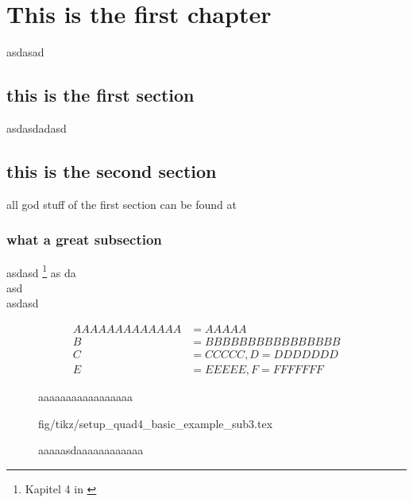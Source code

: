 

\chapter{This is the first chapter} \label{cha:Optimierung}
asdasad
\section{this is the first section}
\label{sec:firstsections}
asdasdadasd
\section{this is the second section}
\label{sec:secondsections}
all god stuff of the first section can be found at 
\subsection{what a great subsection}
asdasd \footnote{Kapitel 4 in \cite{Farhat1991}}
as
da\\
asd
\cite{Optimierung2012}\\
asdasd \cite{Farhat1998}


\begin{equation} \label{eq:test}
    \begin{aligned} 
        AAAAAAAAAAAAA &= AAAAA\\
        B &= BBBBBBBBBBBBBBBB\\
        C &= CCCCC, D=DDDDDDD\\    
        E &= EEEEE, F=FFFFFFF
    \end{aligned}
\end{equation}



\begin{figure}[h!]
	\begin{center}
	    \caption[short caption]{aaaaaaaaaaaaaaaaa}
		\label{fig:ele_setup}
    \end{center}
\end{figure}

%
\begin{figure}[h!]
	\begin{center}
	{fig/tikz/setup_quad4_basic_example_sub3.tex}
    \caption[short captionaa]{aaaaasdaaaaaaaaaaaa}
		\label{fig:basic_feti_example_2x2}
    \end{center}
\end{figure}

